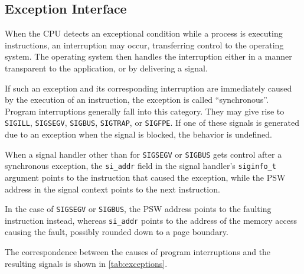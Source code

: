\documentclass[english,11pt,twoside,toc=bib,toc=idx]{scrreprt}
\begin{document}
\subsection{Exception Interface}
\label{exceptionint}
When the CPU detects an exceptional condition while a process is executing
instructions, an interruption may occur, transferring
control to the operating system.  The operating system then handles the
interruption either in a manner transparent to the application, or by
delivering a signal.

If such an exception and its corresponding interruption are immediately
caused by the execution of an instruction, the exception is called
``synchronous''.  Program interruptions generally fall into this category.
They may give rise to \texttt{SIGILL}, \texttt{SIGSEGV}, \texttt{SIGBUS},
\texttt{SIGTRAP}, or \texttt{SIGFPE}\@.  If one of these signals is
generated due to an exception when the signal is blocked, the behavior is
undefined.

When a signal handler other than for \texttt{SIGSEGV} or \texttt{SIGBUS}
gets control after a synchronous exception, the \texttt{si\_addr} field in
the signal handler's \texttt{siginfo\_t} argument points to the
instruction that caused the exception, while the PSW address in the signal context points to the next instruction.

In the case of \texttt{SIGSEGV} or \texttt{SIGBUS}, the PSW address points
to the faulting instruction instead, whereas \texttt{si\_addr} points to
the address of the memory access causing the fault, possibly rounded down
to a page boundary.

The correspondence between the causes of program interruptions and the
resulting signals is shown in
\cref{tab:exceptions}.
\end{document}
